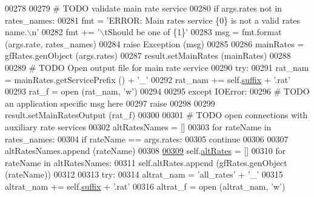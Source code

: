 \begin{DoxyCode}
00278 
00279         \textcolor{comment}{# TODO validate main rate service}
00280         \textcolor{keywordflow}{if} args.rates \textcolor{keywordflow}{not} \textcolor{keywordflow}{in} rates\_names:
00281             fmt  = \textcolor{stringliteral}{'ERROR: Main rates service \{0\} is not a valid rates name.\(\backslash\)n'}
00282             fmt += \textcolor{stringliteral}{'\(\backslash\)tShould be one of \{1\}'}
00283             msg = fmt.format (args.rate, rates\_names)
00284             \textcolor{keywordflow}{raise} Exception (msg)
00285 
00286         mainRates = gfRates.genObject (args.rates)
00287         result.setMainRates (mainRates)
00288         
00289         \textcolor{comment}{# TODO Open output file for main rate service}
00290         \textcolor{keywordflow}{try}:
00291             rat\_nam  =  mainRates.getServicePrefix () + \textcolor{stringliteral}{'\_'}
00292             rat\_nam +=  self.\hyperlink{classe2e_1_1_application_a4d824ad36b051d2d629edb314385df0d}{suffix} + \textcolor{stringliteral}{'.rat'}
00293             rat\_f = open (rat\_nam, \textcolor{stringliteral}{'w'})
00294             
00295         \textcolor{keywordflow}{except} IOError:
00296             \textcolor{comment}{# TODO an application specific msg here}
00297             \textcolor{keywordflow}{raise}        
00298 
00299         result.setMainRatesOutput (rat\_f)
00300             
00301         \textcolor{comment}{# TODO open connections with auxiliary rate services}
00302         altRatesNames = []        
00303         \textcolor{keywordflow}{for} rateName \textcolor{keywordflow}{in} rates\_names:
00304             \textcolor{keywordflow}{if} rateName == args.rates:
00305                 \textcolor{keywordflow}{continue} 
00306             
00307             altRatesNames.append (rateName)
00308 
\hypertarget{classe2e_1_1_application.tex_l00309}{}\hyperlink{classe2e_1_1_application_a92626ca2a674ccbba7f743b13c77fd7b}{00309}         self.\hyperlink{classe2e_1_1_application_a92626ca2a674ccbba7f743b13c77fd7b}{altRates} = []            
00310         \textcolor{keywordflow}{for} rateName \textcolor{keywordflow}{in} altRatesNames:
00311             self.altRates.append (gfRates.genObject (rateName))
00312             
00313         \textcolor{keywordflow}{try}:
00314             altrat\_nam  =  \textcolor{stringliteral}{'all\_rates'} + \textcolor{stringliteral}{'\_'}
00315             altrat\_nam +=  self.\hyperlink{classe2e_1_1_application_a4d824ad36b051d2d629edb314385df0d}{suffix} + \textcolor{stringliteral}{'.rat'}
00316             altrat\_f = open (altrat\_nam, \textcolor{stringliteral}{'w'})

\end{DoxyCode}
